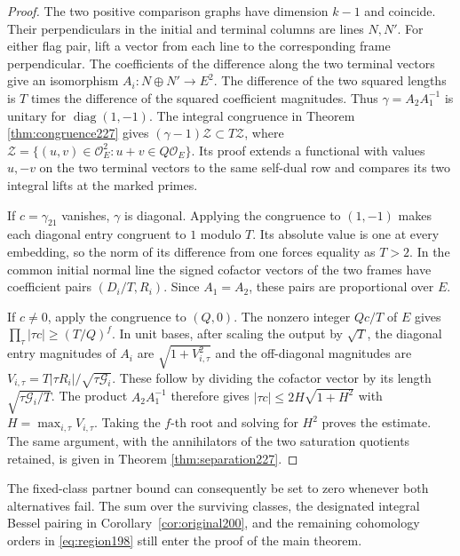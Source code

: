 \documentclass[a4paper,11pt]{article}
\theoremstyle{definition}
\theoremstyle{remark}
\numberwithin{equation}{section}
\begin{document}
\begin{proof}
The two positive comparison graphs have dimension \(k-1\)
and coincide. Their perpendiculars in the initial and terminal
columns are lines \(N,N'\). For either flag pair, lift a
vector from each line to the corresponding frame perpendicular.
The coefficients of the difference along the two terminal
vectors give an isomorphism \(A_i:N\oplus N'\to E^2\). The
difference of the two squared lengths is \(T\) times the
difference of the squared coefficient magnitudes. Thus
\(\gamma=A_2A_1^{-1}\) is unitary for \(\operatorname{diag}(1,-1)\).
The integral congruence in
Theorem \ref{thm:congruence227}
gives \((\gamma-1)\mathcal Z\subset T\mathcal Z\), where
\(\mathcal Z=\{(u,v)\in\mathcal O_E^2:u+v\in Q\mathcal O_E\}\).
Its proof extends a functional with values \(u,-v\) on the
two terminal vectors to the same self-dual row and compares
its two integral lifts at the marked primes.

If \(c=\gamma_{21}\) vanishes, \(\gamma\) is diagonal.
Applying the congruence to \((1,-1)\) makes each diagonal
entry congruent to \(1\) modulo \(T\). Its absolute value
is one at every embedding, so the norm of its difference
from one forces equality as \(T>2\). In the common initial
normal line the signed cofactor vectors of the two frames
have coefficient pairs \((D_i/T,R_i)\). Since \(A_1=A_2\),
these pairs are proportional over \(E\).

If \(c\ne0\), apply the congruence to \((Q,0)\). The nonzero
integer \(Qc/T\) of \(E\) gives
\(\prod_\tau|\tau c|\ge(T/Q)^f\). In unit bases, after
scaling the output by \(\sqrt T\), the diagonal entry
magnitudes of \(A_i\) are \(\sqrt{1+V_{i,\tau}^2}\) and
the off-diagonal magnitudes are
\(V_{i,\tau}=T|\tau R_i|/\sqrt{\tau\mathcal G_i}\).
These follow by dividing the cofactor vector by its length
\(\sqrt{\tau\mathcal G_i/T}\). The product \(A_2 A_1^{-1}\)
therefore gives \(|\tau c|\le2H\sqrt{1+H^2}\) with
\(H=\max_{i,\tau}V_{i,\tau}\). Taking the \(f\)-th root
and solving for \(H^2\) proves the estimate. The same
argument, with the annihilators of the two saturation
quotients retained, is given in
Theorem \ref{thm:separation227}.
\end{proof}

The fixed-class partner bound can consequently be set to
zero whenever both alternatives fail. The sum over the
surviving classes, the designated integral Bessel pairing
in Corollary~\ref{cor:original200}, and the remaining
cohomology orders in \eqref{eq:region198} still enter the
proof of the main theorem.
\end{document}

